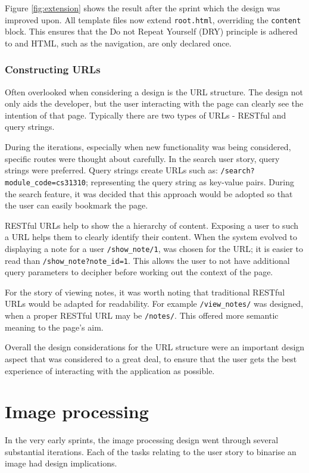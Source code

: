 Figure \ref{fig:extension} shows the result after the sprint which the design was improved upon. All template files now extend \texttt{root.html}, overriding the \texttt{content} block. This ensures that the Do not Repeat Yourself (DRY) principle is adhered to and HTML, such as the navigation, are only declared once.

\subsubsection{Constructing URLs} \label{design:urls}
Often overlooked when considering a design is the URL structure. The design not only aids the developer, but the user interacting with the page can clearly see the intention of that page. Typically there are two types of URLs - RESTful and query strings.

During the iterations, especially when new functionality was being considered, specific routes were thought about carefully. In the search user story, query strings were preferred. Query strings create URLs such as: \texttt{/search?module\_code=cs31310}; representing the query string as key-value pairs. During the search feature, it was decided that this approach would be adopted so that the user can easily bookmark the page.

RESTful URLs help to show the a hierarchy of content. Exposing a user to such a URL helps them to clearly identify their content. When the system evolved to displaying a note for a user \texttt{/show\_note/1}, was chosen for the URL; it is easier to read than  \texttt{/show\_note?note\_id=1}. This allows the user to not have additional query parameters to decipher before working out the context of the page.

For the story of viewing notes, it was worth noting that traditional RESTful URLs would be adapted for readability. For example \texttt{/view\_notes/} was designed, when a proper RESTful URL may be \texttt{/notes/}. This offered more semantic meaning to the page's aim.

Overall the design considerations for the URL structure were an important design aspect that was considered to a great deal, to ensure that the user gets the best experience of interacting with the application as possible.

\section{Image processing}
In the very early sprints, the image processing design went through several substantial iterations. Each of the tasks relating to the user story to binarise an image had design implications.

